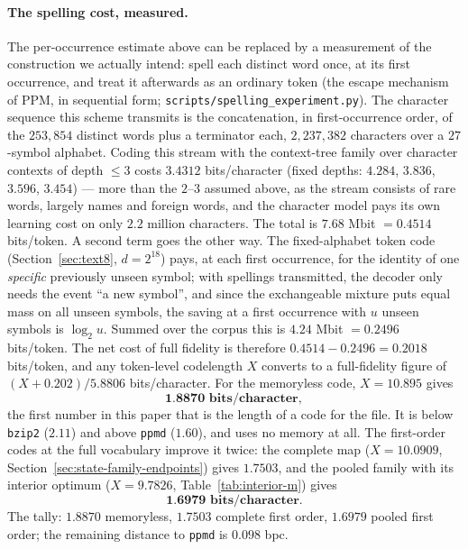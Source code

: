\documentclass[11pt]{article}
\begin{document}
\paragraph{The spelling cost, measured.}
The per-occurrence estimate above can be replaced by a measurement of
the construction we actually intend: spell each distinct word once, at
its first occurrence, and treat it afterwards as an ordinary token
(the escape mechanism of PPM, in sequential form;
\texttt{scripts/spelling\_experiment.py}).  The character sequence
this scheme transmits is the concatenation, in first-occurrence order,
of the $253{,}854$ distinct words plus a terminator each,
$2{,}237{,}382$ characters over a $27$-symbol alphabet.  Coding this
stream with the context-tree family over character contexts of depth
$\le 3$ costs $3.4312$ bits/character (fixed depths: $4.284$, $3.836$,
$3.596$, $3.454$) --- more than the $2$--$3$ assumed above, as the
stream consists of rare words, largely names and foreign words, and
the character model pays its own learning cost on only $2.2$ million
characters.  The total is $7.68$ Mbit $= 0.4514$ bits/token.  A second
term goes the other way.  The fixed-alphabet token code
(Section~\ref{sec:text8}, $d = 2^{18}$) pays, at each first
occurrence, for the identity of one \emph{specific} previously unseen
symbol; with spellings transmitted, the decoder only needs the event
``a new symbol'', and since the exchangeable mixture puts equal mass
on all unseen symbols, the saving at a first occurrence with $u$
unseen symbols is $\log_2 u$.  Summed over the corpus this is
$4.24$ Mbit $= 0.2496$ bits/token.  The net cost of full fidelity is
therefore $0.4514 - 0.2496 = 0.2018$ bits/token, and any token-level
codelength $X$ converts to a full-fidelity figure of
$(X + 0.202)/5.8806$ bits/character.  For the memoryless code,
$X = 10.895$ gives
\[
  \textbf{1.8870 bits/character},
\]
the first number in this paper that is the length of a code for the
file.  It is below \texttt{bzip2} ($2.11$) and above \texttt{ppmd}
($1.60$), and uses no memory at all.  The first-order codes at the
full vocabulary improve it twice: the complete map ($X = 10.0909$,
Section~\ref{sec:state-family-endpoints}) gives $1.7503$, and the
pooled family with its interior optimum
($X = 9.7826$, Table~\ref{tab:interior-m}) gives
\[
  \textbf{1.6979 bits/character}.
\]
The tally: $1.8870$ memoryless, $1.7503$ complete first order,
$1.6979$ pooled first order; the remaining distance to \texttt{ppmd}
is $0.098$ bpc.
\end{document}
